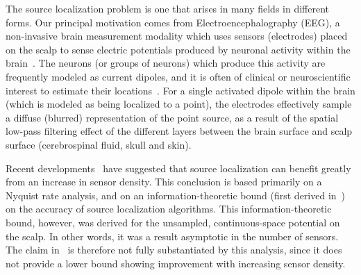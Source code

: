 \documentclass[conference]{IEEEtran}
\begin{document}


The source localization problem is one that arises in many fields in different
forms. Our principal motivation comes from Electroencephalography (EEG), a
non-invasive brain measurement modality which uses sensors (electrodes) placed
on the scalp to sense electric potentials produced by neuronal activity within
the brain~\cite{Nunez2006Electric}. The neurons (or groups of neurons) which
produce this activity are frequently modeled as current dipoles, and it is
often of clinical or neuroscientific interest to estimate their
locations~\cite{Baillet2001Electromagnetic}. For a single activated dipole
within the brain (which is modeled as being localized to a point), the
electrodes effectively sample a diffuse (blurred) representation of the point
source, as a result of the spatial low-pass filtering effect of the different
layers between the brain surface and scalp surface (cerebrospinal fluid, skull
and skin).

Recent developments~\cite{Grover2016Information} have suggested that source
localization can benefit greatly from an increase in sensor density. This
conclusion is based primarily on a Nyquist rate analysis, and on an
information-theoretic bound (first derived in~\cite{Grover2016Fundamental}) on
the accuracy of source localization algorithms. This information-theoretic
bound, however, was derived for the unsampled, continuous-space potential on
the scalp. In other words, it was a result asymptotic in the number of sensors.
The claim in~\cite{Grover2016Information} is therefore not fully substantiated
by this analysis, since it does not provide a lower bound showing improvement
with increasing sensor density.
\end{document}
